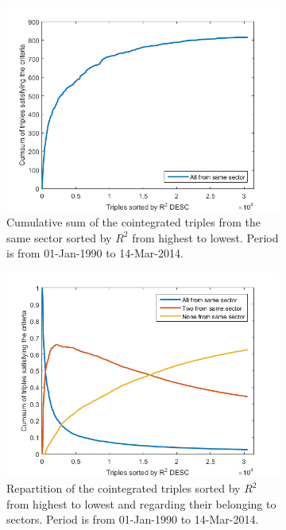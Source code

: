\documentclass[11pt,a4,twosided,singlespacing,titlepagenumber=on]{scrreprt}
\numberwithin{equation}{chapter} %
\theoremstyle{remark}
\begin{document}
\begin{figure}[H]
    \centering
    \begin{subfigure}[t]{0.49\textwidth}
        \centering
        \includegraphics[width=1\textwidth]{triples_sector_0}
        \caption{Cumulative sum of the cointegrated triples from the same sector sorted by $R^2$ from highest to lowest. Period is from 01-Jan-1990 to 14-Mar-2014.}
        \label{triples_sector_0}
    \end{subfigure}
    \begin{subfigure}[t]{0.49\textwidth}
        \centering
        \includegraphics[width=1\textwidth]{triples_sector_1}
        \caption{Repartition of the cointegrated triples sorted by $R^2$ from highest to lowest and regarding their belonging to sectors. Period is from 01-Jan-1990 to 14-Mar-2014.}
        \label{triples_sector_1}
    \end{subfigure}
    \caption{}
\end{figure}
\end{document}
